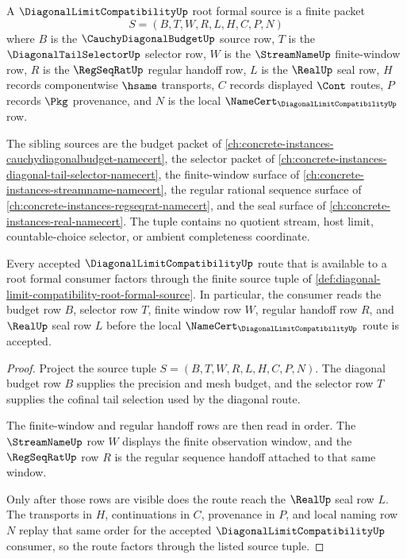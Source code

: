 \begin{definition}
\label{def:diagonal-limit-compatibility-root-formal-source}
A $\DiagonalLimitCompatibilityUp$ root formal source is a finite packet
$$
S=(B,T,W,R,L,H,C,P,N)
$$
where $B$ is the $\CauchyDiagonalBudgetUp$ source row, $T$ is the $\DiagonalTailSelectorUp$ selector row, $W$ is the $\StreamNameUp$ finite-window row, $R$ is the $\RegSeqRatUp$ regular handoff row, $L$ is the $\RealUp$ seal row, $H$ records componentwise $\hsame$ transports, $C$ records displayed $\Cont$ routes, $P$ records $\Pkg$ provenance, and $N$ is the local $\NameCert_{\DiagonalLimitCompatibilityUp}$ row.

The sibling sources are the budget packet of \autoref{ch:concrete-instances-cauchydiagonalbudget-namecert}, the selector packet of \autoref{ch:concrete-instances-diagonal-tail-selector-namecert}, the finite-window surface of \autoref{ch:concrete-instances-streamname-namecert}, the regular rational sequence surface of \autoref{ch:concrete-instances-regseqrat-namecert}, and the seal surface of \autoref{ch:concrete-instances-real-namecert}. The tuple contains no quotient stream, host limit, countable-choice selector, or ambient completeness coordinate.
\end{definition}

\begin{theorem}
\label{thm:diagonal-limit-compatibility-root-formal-route}
Every accepted $\DiagonalLimitCompatibilityUp$ route that is available to a root formal consumer factors through the finite source tuple of \autoref{def:diagonal-limit-compatibility-root-formal-source}. In particular, the consumer reads the budget row $B$, selector row $T$, finite window row $W$, regular handoff row $R$, and $\RealUp$ seal row $L$ before the local $\NameCert_{\DiagonalLimitCompatibilityUp}$ route is accepted.
\end{theorem}
\begin{proof}
Project the source tuple $S=(B,T,W,R,L,H,C,P,N)$. The diagonal budget row $B$ supplies the precision and mesh budget, and the selector row $T$ supplies the cofinal tail selection used by the diagonal route.

The finite-window and regular handoff rows are then read in order. The $\StreamNameUp$ row $W$ displays the finite observation window, and the $\RegSeqRatUp$ row $R$ is the regular sequence handoff attached to that same window.

Only after those rows are visible does the route reach the $\RealUp$ seal row $L$. The transports in $H$, continuations in $C$, provenance in $P$, and local naming row $N$ replay that same order for the accepted $\DiagonalLimitCompatibilityUp$ consumer, so the route factors through the listed source tuple.
\end{proof}

